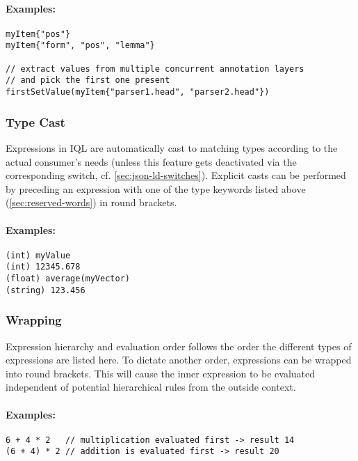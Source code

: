 \documentclass[11pt,a4paper,portrait]{article}
\newcommand{\iql}{IQL\xspace}
\begin{document}
\paragraph{Examples:}

\begin{verbatim}
myItem{"pos"}
myItem{"form", "pos", "lemma"} 

// extract values from multiple concurrent annotation layers
// and pick the first one present
firstSetValue(myItem{"parser1.head", "parser2.head"})  
\end{verbatim}

\subsubsection{Type Cast}
\label{sec:type-cast}

Expressions in \iql are automatically cast to matching types according to the actual consumer's needs (unless this feature gets deactivated via the corresponding switch, cf. \cref{sec:json-ld-switches}). Explicit casts can be performed by preceding an expression with one of the type keywords listed above (\ref{sec:reserved-words}) in round brackets.

\paragraph{Examples:}

\begin{verbatim}
(int) myValue
(int) 12345.678
(float) average(myVector)
(string) 123.456
\end{verbatim}

\subsubsection{Wrapping}
\label{sec:wrapping}

Expression hierarchy and evaluation order follows the order the different types of expressions are listed here. To dictate another order, expressions can be wrapped into round brackets. This will cause the inner expression to be evaluated independent of potential hierarchical rules from the outside context.

\paragraph{Examples:}

\begin{verbatim}
6 + 4 * 2   // multiplication evaluated first -> result 14
(6 + 4) * 2 // addition is evaluated first -> result 20
\end{verbatim}
\end{document}
